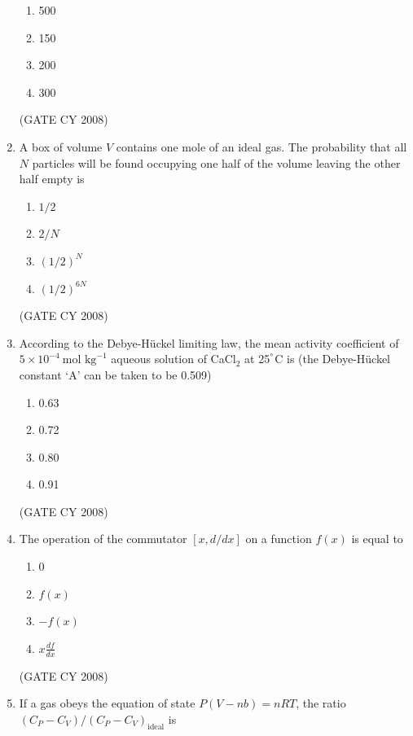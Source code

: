 \documentclass[12pt]{article}
\begin{document}
\begin{enumerate}
\begin{enumerate}
\item 500
\item 150
\item 200
\item 300
\end{enumerate}    \hfill{(GATE CY 2008)}




\item A box of volume $V$ contains one mole of an ideal gas. The probability that all $N$ particles will be found occupying one half of the volume leaving the other half empty is

\begin{enumerate}
\item $1/2$
\item $2/N$
\item $(1/2)^N$
\item $(1/2)^{6N}$
\end{enumerate}    \hfill{(GATE CY 2008)}




\item According to the Debye-Hückel limiting law, the mean activity coefficient of $5 \times 10^{-4}~\text{mol kg}^{-1}$ aqueous solution of CaCl$_2$ at 25$^\degree$C is (the Debye-Hückel constant ‘A’ can be taken to be 0.509)

\begin{enumerate}
\item 0.63
\item 0.72
\item 0.80
\item 0.91
\end{enumerate}    \hfill{(GATE CY 2008)}




\item The operation of the commutator $[x, d/dx]$ on a function $f(x)$ is equal to

\begin{enumerate}
\item 0
\item $f(x)$
\item $-f(x)$
\item $x \frac{df}{dx}$
\end{enumerate}    \hfill{(GATE CY 2008)}




\item If a gas obeys the equation of state $P (V - nb) = nRT$, the ratio $(C_P - C_V)/(C_P - C_V)_{\text{ideal}}$ is


\end{enumerate}
\end{document}
